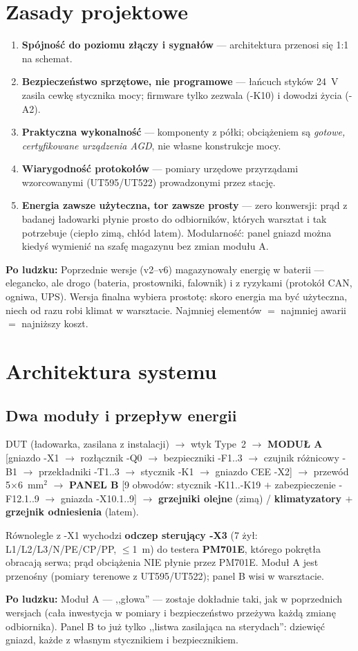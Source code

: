 \documentclass[11pt,a4paper]{article}
\newcommand{\why}[1]{\par\smallskip\noindent\colorbox{blue!6}{\parbox{0.965\linewidth}{\small\textbf{Po ludzku:} #1}}\par\smallskip}
\begin{document}
\section{Zasady projektowe}
\begin{enumerate}
\item \textbf{Spójność do poziomu złączy i sygnałów} --- architektura przenosi się 1:1 na schemat.
\item \textbf{Bezpieczeństwo sprzętowe, nie programowe} --- łańcuch styków 24~V zasila cewkę
stycznika mocy; firmware tylko zezwala (-K10) i dowodzi życia (-A2).
\item \textbf{Praktyczna wykonalność} --- komponenty z półki; obciążeniem są \emph{gotowe,
certyfikowane urządzenia AGD}, nie własne konstrukcje mocy.
\item \textbf{Wiarygodność protokołów} --- pomiary urzędowe przyrządami wzorcowanymi
(UT595/UT522) prowadzonymi przez stację.
\item \textbf{Energia zawsze użyteczna, tor zawsze prosty} --- zero konwersji: prąd z badanej
ładowarki płynie prosto do odbiorników, których warsztat i tak potrzebuje (ciepło zimą, chłód
latem). Modularność: panel gniazd można kiedyś wymienić na szafę magazynu bez zmian modułu A.
\end{enumerate}
\why{Poprzednie wersje (v2--v6) magazynowały energię w baterii --- elegancko, ale drogo (bateria,
prostowniki, falownik) i z ryzykami (protokół CAN, ogniwa, UPS). Wersja finalna wybiera prostotę:
skoro energia ma być użyteczna, niech od razu robi klimat w warsztacie. Najmniej elementów $=$
najmniej awarii $=$ najniższy koszt.}

\section{Architektura systemu}
\subsection{Dwa moduły i przepływ energii}
\begin{center}\small
DUT (ładowarka, zasilana z instalacji) $\to$ wtyk Type~2 $\to$ \textbf{MODUŁ A} [gniazdo -X1 $\to$
rozłącznik -Q0 $\to$ bezpieczniki -F1..3 $\to$ czujnik różnicowy -B1 $\to$ przekładniki -T1..3 $\to$
stycznik -K1 $\to$ gniazdo CEE -X2] $\to$ przewód 5$\times$6~mm$^2$ $\to$ \textbf{PANEL B}
[9 obwodów: stycznik -K11..-K19 $+$ zabezpieczenie -F12.1..9 $\to$ gniazda -X10.1..9] $\to$
\textbf{grzejniki olejne} (zimą) / \textbf{klimatyzatory $+$ grzejnik odniesienia} (latem).
\end{center}
Równolegle z -X1 wychodzi \textbf{odczep sterujący -X3} (7 żył: L1/L2/L3/N/PE/CP/PP, $\le$1~m) do
testera \textbf{PM701E}, którego pokrętła obracają serwa; prąd obciążenia NIE płynie przez PM701E.
Moduł A jest przenośny (pomiary terenowe z UT595/UT522); panel B wisi w warsztacie.
\why{Moduł A --- ,,głowa'' --- zostaje dokładnie taki, jak w poprzednich wersjach (cała inwestycja
w pomiary i bezpieczeństwo przeżywa każdą zmianę odbiornika). Panel B to już tylko ,,listwa
zasilająca na sterydach'': dziewięć gniazd, każde z własnym stycznikiem i bezpiecznikiem.}
\end{document}
